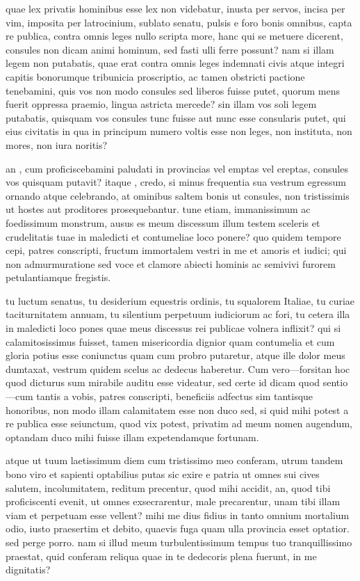  quae lex privatis hominibus esse lex non videbatur, inusta per servos, incisa per vim, imposita per latrocinium, sublato senatu, pulsis e foro bonis omnibus, capta re publica, contra omnis leges nullo scripta more, hanc qui se metuere dicerent, consules non dicam animi hominum, sed fasti ulli ferre possunt? nam si illam legem non putabatis, quae erat contra omnis leges indemnati civis atque integri capitis bonorumque tribunicia proscriptio, ac tamen obstricti pactione tenebamini, quis vos non modo consules sed liberos fuisse putet, quorum mens fuerit oppressa praemio, lingua astricta mercede? sin illam vos soli legem putabatis, quisquam vos consules tunc fuisse aut nunc esse consularis putet, qui eius civitatis in qua in principum numero voltis esse non leges, non instituta, non mores, non iura noritis?

 an , cum proficiscebamini paludati in provincias vel emptas vel ereptas, consules vos quisquam putavit? itaque , credo, si minus frequentia sua vestrum egressum ornando atque celebrando, at ominibus saltem bonis ut consules, non tristissimis ut hostes aut proditores prosequebantur. tune etiam, immanissimum ac foedissimum monstrum, ausus es meum discessum illum testem sceleris et crudelitatis tuae in maledicti et contumeliae loco ponere? quo quidem tempore cepi, patres conscripti, fructum immortalem vestri in me et amoris et iudici; qui non admurmuratione sed voce et clamore abiecti hominis ac semivivi furorem petulantiamque fregistis.

 tu luctum senatus, tu desiderium equestris ordinis, tu squalorem Italiae, tu curiae taciturnitatem annuam, tu silentium perpetuum iudiciorum ac fori, tu cetera illa in maledicti loco pones quae meus discessus rei publicae volnera inflixit? qui si calamitosissimus fuisset, tamen misericordia dignior quam contumelia et cum gloria potius esse coniunctus quam cum probro putaretur, atque ille dolor meus dumtaxat, vestrum quidem scelus ac dedecus haberetur. Cum vero—forsitan hoc quod dicturus sum mirabile auditu esse videatur, sed certe id dicam quod sentio—cum tantis a vobis, patres conscripti, beneficiis adfectus sim tantisque honoribus, non modo illam calamitatem esse non duco sed, si quid mihi potest a re publica esse seiunctum, quod vix potest, privatim ad meum nomen augendum, optandam duco mihi fuisse illam expetendamque fortunam.

 atque ut tuum laetissimum diem cum tristissimo meo conferam, utrum tandem bono viro et sapienti optabilius putas sic exire e patria ut omnes sui cives salutem, incolumitatem, reditum precentur, quod mihi accidit, an, quod tibi proficiscenti evenit, ut omnes exsecrarentur, male precarentur, unam tibi illam viam et perpetuam esse vellent? mihi me dius fidius in tanto omnium mortalium odio, iusto praesertim et debito, quaevis fuga quam ulla provincia esset optatior. sed perge porro. nam si illud meum turbulentissimum tempus tuo tranquillissimo praestat, quid conferam reliqua quae in te dedecoris plena fuerunt, in me dignitatis?

